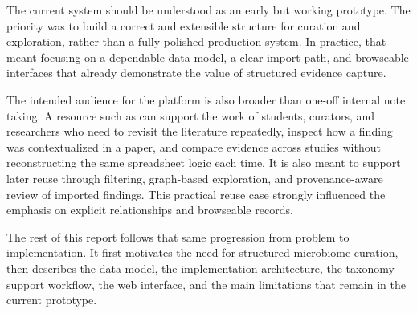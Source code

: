 The current system should be understood as an early but working prototype. The priority was to build a correct and extensible structure for curation and exploration, rather than a fully polished production system. In practice, that meant focusing on a dependable data model, a clear import path, and browseable interfaces that already demonstrate the value of structured evidence capture.

The intended audience for the platform is also broader than one-off internal note taking. A resource such as \projectname{} can support the work of students, curators, and researchers who need to revisit the literature repeatedly, inspect how a finding was contextualized in a paper, and compare evidence across studies without reconstructing the same spreadsheet logic each time. It is also meant to support later reuse through filtering, graph-based exploration, and provenance-aware review of imported findings. This practical reuse case strongly influenced the emphasis on explicit relationships and browseable records.

The rest of this report follows that same progression from problem to implementation. It first motivates the need for structured microbiome curation, then describes the data model, the implementation architecture, the taxonomy support workflow, the web interface, and the main limitations that remain in the current prototype.

